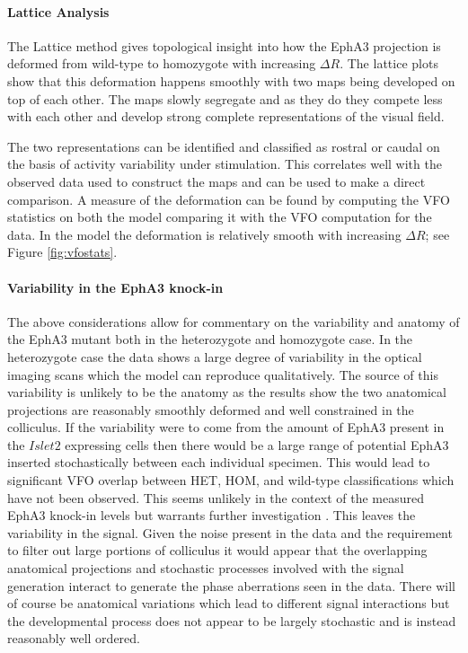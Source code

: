 \paragraph{Lattice Analysis}
The Lattice method gives topological insight into how the EphA3 projection is deformed from wild-type to homozygote with increasing $\Delta R$. The lattice plots show that this deformation happens smoothly with two maps being developed on top of each other. The maps slowly segregate and as they do they compete less with each other and develop strong complete representations of the visual field. 

The two representations can be identified and classified as rostral or caudal on the basis of activity variability under stimulation. This correlates well with the observed data used to construct the maps and can be used to make a direct comparison. A measure of the deformation can be found by computing the VFO statistics on both the model comparing it with the VFO computation for the data. In the model the deformation is relatively smooth with increasing $\Delta R$; see Figure \ref{fig:vfostats}.
\paragraph{Variability in the EphA3 knock-in}
The above considerations allow for commentary on the variability and anatomy of the EphA3 mutant both in the heterozygote and homozygote case. In the heterozygote case the data shows a large degree of variability in the optical imaging scans which the model can reproduce qualitatively. The source of this variability is unlikely to be the anatomy as the results show the two anatomical projections are reasonably smoothly deformed and well constrained in the colliculus. If the variability were to come from the amount of EphA3 present in the $Islet2$ expressing cells then there would be a large range of potential EphA3 inserted stochastically between each individual specimen. This would lead to significant VFO overlap between HET, HOM, and wild-type classifications which have not been observed. This seems unlikely in the context of the measured EphA3 knock-in levels but warrants further investigation \cite{Reber2004-wq}. This leaves the variability in the signal. Given the noise present in the data and the requirement to filter out large portions of colliculus it would appear that the overlapping anatomical projections and stochastic processes involved with the signal generation interact to generate the phase aberrations seen in the data. There will of course be anatomical variations which lead to different signal interactions but the developmental process does not appear to be largely stochastic and is instead reasonably well ordered.

